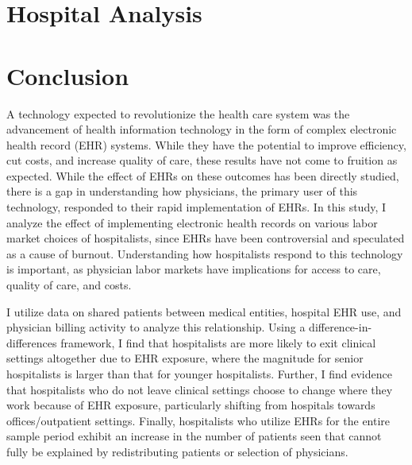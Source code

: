 \documentclass[12pt]{article}
\begin{document}
\section{Hospital Analysis}\label{sec:hospanalysis}


\section{Conclusion}

A technology expected to revolutionize the health care system was the advancement of health information technology in the form of complex electronic health record (EHR) systems. While they have the potential to improve efficiency, cut costs, and increase quality of care, these results have not come to fruition as expected. While the effect of EHRs on these outcomes has been directly studied, there is a gap in understanding how physicians, the primary user of this technology, responded to their rapid implementation of EHRs. In this study, I analyze the effect of implementing electronic health records on various labor market choices of hospitalists, since EHRs have been controversial and speculated as a cause of burnout. Understanding how hospitalists respond to this technology is important, as physician labor markets have implications for access to care, quality of care, and costs. 

I utilize data on shared patients between medical entities, hospital EHR use, and physician billing activity to analyze this relationship. Using a difference-in-differences framework, I find that hospitalists are more likely to exit clinical settings altogether due to EHR exposure, where the magnitude for senior hospitalists is larger than that for younger hospitalists. Further, I find evidence that hospitalists who do not leave clinical settings choose to change where they work because of EHR exposure, particularly shifting from hospitals towards offices/outpatient settings. Finally, hospitalists who utilize EHRs for the entire sample period exhibit an increase in the number of patients seen that cannot fully be explained by redistributing patients or selection of physicians. 
\end{document}
